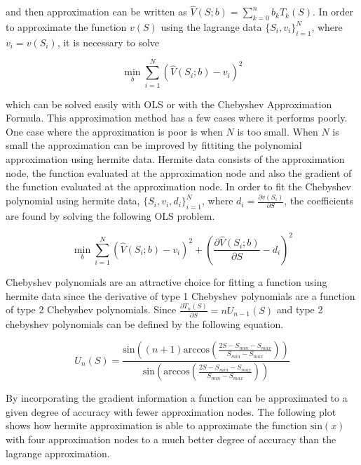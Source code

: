 \documentclass[12pt]{article}
\begin{document}
and then approximation can be written as $\hat{V}(S;b)=\sum_{k=0}^n b_k T_k(S)$.
In order to approximate the function $v(S)$ using the lagrange data $\{S_i,v_i\}_{i=1}^N$, where $v_i=v(S_i)$, it is necessary to solve

\begin{equation*}
  \min_b \sum_{i=1}^N (\hat{V}(S_i;b)-v_i)^2
\end{equation*}

which can be solved easily with OLS or with the Chebyshev Approximation Formula. This approximation method has a few cases where it performs poorly. One case where the approximation is poor is when $N$ is too small. When $N$ is small the approximation can be improved by fittiting the polynomial approximation using hermite data. Hermite data consists of the approximation node, the function evaluated at the approximation node and also the gradient of the function evaluated at the approximation node. In order to fit the Chebyshev polynomial using hermite data, $\{S_i,v_i,d_i\}_{i=1}^N$, where $d_i=\frac{\partial v(S_i)}{\partial S}$, the coefficients are found by solving the following OLS problem.

\begin{equation*}
  \min_b \sum_{i=1}^N (\hat{V}(S_i;b)-v_i)^2 + (\frac{\partial \hat{V}(S_i;b)}{\partial S} - d_i)^2
\end{equation*}

Chebyshev polynomials are an attractive choice for fitting a function using hermite data since the derivative of type 1 Chebyshev polynomials are a function of type 2 Chebyshev polynomials. Since $\frac{\partial T_n(S)}{\partial S} = n U_{n-1}(S)$ and type 2 chebyshev polynomials can be defined by the following equation.

\begin{equation*}
  U_n(S) = \frac{\text{sin}((n+1) \text{arccos}(\frac{2S-S_{min}-S_{max}}{S_{min}-S_{max}}))}{\text{sin}(\text{arccos}(\frac{2S-S_{min}-S_{max}}{S_{min}-S_{max}}))}
\end{equation*}

By incorporating the gradient information a function can be approximated to a given degree of accuracy with fewer approximation nodes. The following plot shows how hermite approximation is able to approximate the function $\text{sin}(x)$ with four approximation nodes to a much better degree of accuracy than the lagrange approximation.
\end{document}
